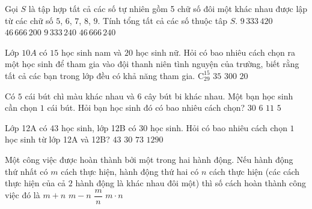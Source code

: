 \begin{ex}%
	Gọi $S$ là tập hợp tất cả các số tự nhiên gồm 5 chữ số đôi một khác nhau được lập từ các chữ số $5$, $6$, $7$, $8$, $9$. Tính tổng tất cả các  số thuộc tâp $S$.
	\choice 
		{$9\,333\,420$} 
		{$46\,666\,200$} 
		 {\True $9\,333\,240$}
		{$46\,666\,240$} 
\end{ex}

\begin{ex}%
	Lớp $10A$ có $15$ học sinh nam và $20$ học sinh nữ. Hỏi có bao nhiêu cách chọn ra một học sinh để tham gia vào đội thanh niên tình nguyện  của trường, biết rằng tất cả các bạn trong lớp đều có khả năng tham gia.
	 \choice
		 {$\mathrm{C}_{29}^{15}$}
		 {\True $35$}
		{$300$} 
		{$20$} 
\end{ex}

\begin{ex}%
	Có $5$ cái bút chì màu khác nhau và $6$ cây bút bi khác nhau. Một bạn học sinh cần chọn $1$ cái bút. Hỏi bạn học sinh  đó có bao nhiêu cách chọn?
	 \choice
		{$30$} 
		 {$6$}
		{\True $11$} 
		{$5$} 
\end{ex}

\begin{ex}%
	Lớp 12A có $43$ học sinh, lớp 12B có $30$  học sinh. Hỏi có bao nhiêu cách chọn $1$ học sinh từ lớp 12A và 12B?
	\choice 
		{$43$} 
		 {$30$}
		{\True  $73$}
		{$1290$} 
\end{ex}

\begin{ex}%
	 Một công việc được hoàn thành bởi một trong hai hành động. Nếu hành động thứ nhất có $m$ cách thực hiện, hành động thứ hai có $n$ cách thực hiện (các cách thực hiện của cả $2$ hành động là khác nhau đôi một) thì số cách hoàn thành công việc đó là
	 \choice
		 {\True $m+n$}
		 {$m-n$}
		{$\dfrac{m}{n}$} 
		 {$m \cdot n$}
\end{ex}


